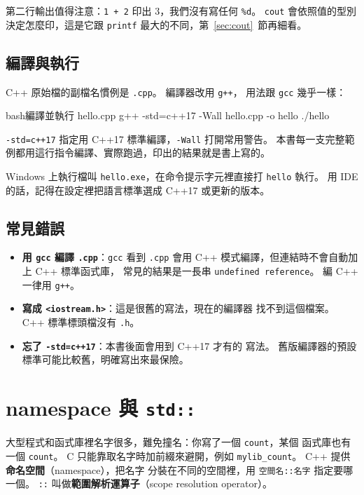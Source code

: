 第二行輸出值得注意：\texttt{1 + 2} 印出 $3$，我們沒有寫任何
\texttt{\%d}。 \texttt{cout} 會依照值的型別決定怎麼印，這是它跟
\texttt{printf} 最大的不同，第~\ref{sec:cout}~節再細看。

\subsection{編譯與執行}

C++ 原始檔的副檔名慣例是 \texttt{.cpp}。 編譯器改用 \texttt{g++}，
用法跟 \texttt{gcc} 幾乎一樣：

\begin{code}{bash}{編譯並執行 hello.cpp}
g++ -std=c++17 -Wall hello.cpp -o hello
./hello
\end{code}

\texttt{-std=c++17} 指定用 C++17 標準編譯，\texttt{-Wall} 打開常用警告。
本書每一支完整範例都用這行指令編譯、實際跑過，印出的結果就是書上寫的。

Windows 上執行檔叫 \texttt{hello.exe}，在命令提示字元裡直接打
\texttt{hello} 執行。 用 IDE 的話，記得在設定裡把語言標準選成 C++17
或更新的版本。

\subsection{常見錯誤}

\begin{itemize}
\item \textbf{用 \texttt{gcc} 編譯 \texttt{.cpp}}：\texttt{gcc} 看到
\texttt{.cpp} 會用 C++ 模式編譯，但連結時不會自動加上 C++ 標準函式庫，
常見的結果是一長串 \texttt{undefined reference}。 編 C++ 一律用
\texttt{g++}。
\item \textbf{寫成 \texttt{<iostream.h>}}：這是很舊的寫法，現在的編譯器
找不到這個檔案。 C++ 標準標頭檔沒有 \texttt{.h}。
\item \textbf{忘了 \texttt{-std=c++17}}：本書後面會用到 C++17 才有的
寫法。 舊版編譯器的預設標準可能比較舊，明確寫出來最保險。
\end{itemize}

\section{namespace 與 \texttt{std::}}
\label{sec:namespace}

大型程式和函式庫裡名字很多，難免撞名：你寫了一個 \texttt{count}，某個
函式庫也有一個 \texttt{count}。 C 只能靠取名字時加前綴來避開，例如
\texttt{mylib\_count}。 C++ 提供\textbf{命名空間}（namespace），把名字
分裝在不同的空間裡，用 \texttt{空間名::名字} 指定要哪一個。
\texttt{::} 叫做\textbf{範圍解析運算子}（scope resolution operator）。

